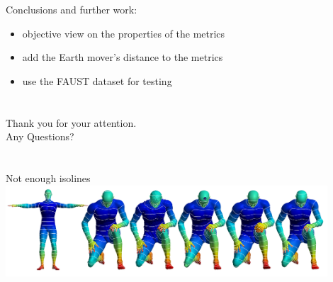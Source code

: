 \documentclass[]{beamer}
\begin{document}
	\begin{frame}
		Conclusions and further work:
		\begin{itemize}
			\item objective view on the properties of the metrics
			\item add the Earth mover's distance to the metrics
			\item use the FAUST dataset for testing
		\end{itemize}

	\end{frame}

\section*{}
	\begin{frame}
		\centering \large
		Thank you for your attention.\\
		Any Questions?
	\end{frame}

\section*{} %
\appendix
	\begin{frame}{Not enough isolines}
		\includegraphics[width=0.9\textwidth]{results/diffusion_small_isolines.png}\\
	\end{frame}
\end{document}

